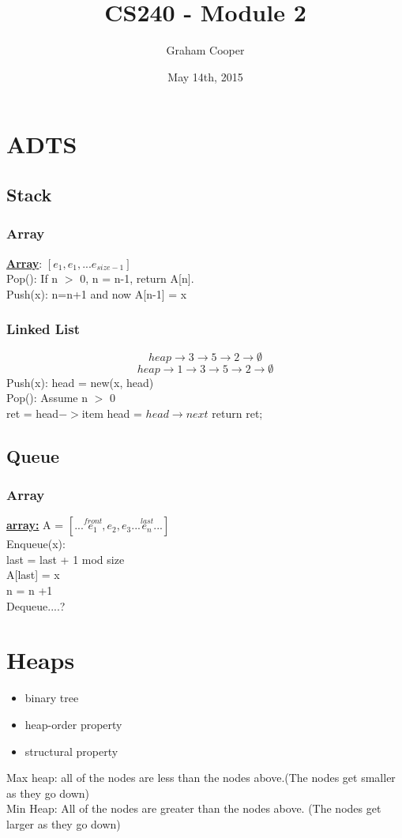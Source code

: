 \documentclass[12pt]{article}
\title{\vspace{-15ex}CS240 - Module 2\vspace{-1ex}}
\date{May 14th, 2015}
\author{Graham Cooper}
\newcommand{\myt}[1]{\textbf{\underline{#1}}}
\begin{document}
	\maketitle
	
	\section*{ADTS}
	
	\subsection*{Stack}
	\subsubsection*{Array}
	\myt{Array}: $[e_1, e_1, ... e_{size-1}]$\\
	Pop(): If n $>$ 0, n = n-1, return A[n].\\
	Push(x): n=n+1 and now A[n-1] = x\\
	\subsubsection*{Linked List}
	$$heap \rightarrow 3 \rightarrow 5 \rightarrow 2 \rightarrow \emptyset$$
	$$heap \rightarrow 1 \rightarrow 3 \rightarrow 5 \rightarrow 2 \rightarrow \emptyset$$
	Push(x): head = new(x, head)\\
	Pop(): Assume n $>$ 0\\
	ret = head$->$item
	head = $head \rightarrow next$
	return ret;
	
	
	\subsection*{Queue}
	\subsubsection*{Array}
	\myt{array:} A = $[... \overset{front}{e_1}, e_2, e_3 ... \overset{last}{e_n} ...]$\\
	Enqueue(x):\\
	last = last + 1 mod size\\
	A[last] = x\\
	n = n +1\\
	Dequeue....?\\
	
	\section*{Heaps}
	\begin{itemize}
		\item binary tree
		\item heap-order property
		\item structural property 
	\end{itemize}
	Max heap: all of the nodes are less than the nodes above.(The nodes get smaller as they go down)\\
	Min Heap: All of the nodes are greater than the nodes above. (The nodes get larger as they go down)\\
	
\end{document}
